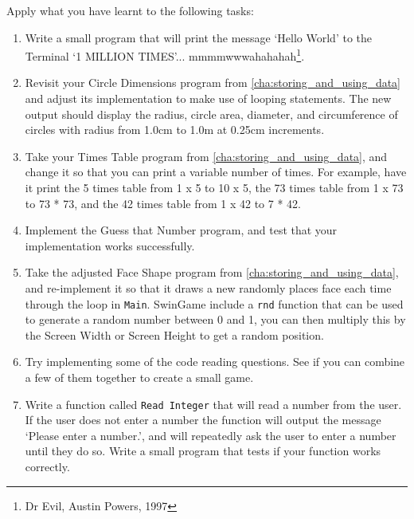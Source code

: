\clearpage

Apply what you have learnt to the following tasks:
\begin{enumerate}
  \item Write a small program that will print the message `Hello World' to the Terminal `1 MILLION TIMES'... mmmmwwwahahahah\footnote{Dr Evil, Austin Powers, 1997}.
  \item Revisit your Circle Dimensions program from \cref{cha:storing_and_using_data} and adjust its implementation to make use of looping statements. The new output should display the radius, circle area, diameter, and circumference of circles with radius from 1.0cm to 1.0m at 0.25cm increments.
  \item Take your Times Table program from \cref{cha:storing_and_using_data}, and change it so that you can print a variable number of times. For example, have it print the 5 times table from 1 x 5 to 10 x 5, the 73 times table from 1 x 73 to 73 * 73, and the 42 times table from 1 x 42 to 7 * 42.  
  \item Implement the Guess that Number program, and test that your implementation works successfully.
  \item Take the adjusted Face Shape program from \cref{cha:storing_and_using_data}, and re-implement it so that it draws a new randomly places face each time through the loop in \texttt{Main}. SwinGame include a \texttt{rnd} function that can be used to generate a random number between 0 and 1, you can then multiply this by the Screen Width or Screen Height to get a random position.
  \item Try implementing some of the code reading questions. See if you can combine a few of them together to create a small game.
  
  \item Write a function called \texttt{Read Integer} that will read a number from the user. If the user does not enter a number the function will output the message `Please enter a number.', and will repeatedly ask the user to enter a number until they do so. Write a small program that tests if your function works correctly.
  
  \begin{figure}[h]
  \end{figure}
  

\end{enumerate}
